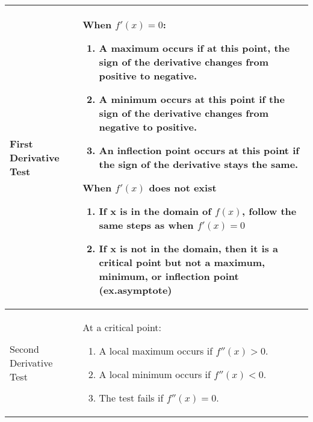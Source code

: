 \documentclass{ximera}
\begin{document}
\begin{center}
\begin{tabular}{| l | p{7.5cm} |}
\hline
First Derivative Test & When $f'(x) = 0$: \begin{enumerate}
\item{A maximum occurs if at this point, the sign of the derivative changes from positive to negative.}
\item{A minimum occurs at this point if the sign of the derivative changes from negative to positive.}
\item{An inflection point occurs at this point if the sign of the derivative stays the same.}
\end{enumerate}
\item{When $f'(x)$ does not exist\:}
\begin{enumerate}
\item{If x is in the domain of $f(x)$, follow the same steps as when $f'(x)=0$}
\item{If x is not in the domain, then it is a critical point but not a maximum, minimum, or inflection point (ex.asymptote)}
\end{enumerate}\\
\hline
Second Derivative Test &  At a critical point: \begin{enumerate}
\item{A local maximum occurs if $f''(x)>0$.}
\item{A local minimum occurs if $f''(x)<0$.}
\item{The test fails if $f''(x)=0$.}
\end{enumerate}\\ \hline
\end{tabular}
\end{center}
\end{document}
